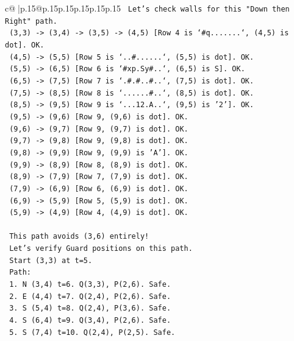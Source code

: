 \documentclass{article}
\begin{document}
{\begin{supertabular}{c@{$\;$}|p{.15\linewidth}@{}p{.15\linewidth}p{.15\linewidth}p{.15\linewidth}p{.15\linewidth}p{.15\linewidth}}
{{{\texttt{  Let's check walls for this "Down then Right" path.} \\
\texttt{  (3,3) {-}> (3,4) {-}> (3,5) {-}> (4,5) {[}Row 4 is `\#q.......`, (4,5) is dot{]}. OK.} \\
\texttt{  (4,5) {-}> (5,5) {[}Row 5 is `..\#......`, (5,5) is dot{]}. OK.} \\
\texttt{  (5,5) {-}> (6,5) {[}Row 6 is `\#xp.Sy\#..`, (6,5) is S{]}. OK.} \\
\texttt{  (6,5) {-}> (7,5) {[}Row 7 is `.\#.\#..\#..`, (7,5) is dot{]}. OK.} \\
\texttt{  (7,5) {-}> (8,5) {[}Row 8 is `......\#..`, (8,5) is dot{]}. OK.} \\
\texttt{  (8,5) {-}> (9,5) {[}Row 9 is `...12.A..`, (9,5) is '2'{]}. OK.} \\
\texttt{  (9,5) {-}> (9,6) {[}Row 9, (9,6) is dot{]}. OK.} \\
\texttt{  (9,6) {-}> (9,7) {[}Row 9, (9,7) is dot{]}. OK.} \\
\texttt{  (9,7) {-}> (9,8) {[}Row 9, (9,8) is dot{]}. OK.} \\
\texttt{  (9,8) {-}> (9,9) {[}Row 9, (9,9) is 'A'{]}. OK.} \\
\texttt{  (9,9) {-}> (8,9) {[}Row 8, (8,9) is dot{]}. OK.} \\
\texttt{  (8,9) {-}> (7,9) {[}Row 7, (7,9) is dot{]}. OK.} \\
\texttt{  (7,9) {-}> (6,9) {[}Row 6, (6,9) is dot{]}. OK.} \\
\texttt{  (6,9) {-}> (5,9) {[}Row 5, (5,9) is dot{]}. OK.} \\
\texttt{  (5,9) {-}> (4,9) {[}Row 4, (4,9) is dot{]}. OK.} \\
\\ 
\texttt{  This path avoids (3,6) entirely!} \\
\texttt{  Let's verify Guard positions on this path.} \\
\texttt{  Start (3,3) at t=5.} \\
\texttt{  Path:} \\
\texttt{  1. N (3,4) t=6. Q(3,3), P(2,6). Safe.} \\
\texttt{  2. E (4,4) t=7. Q(2,4), P(2,6). Safe.} \\
\texttt{  3. S (5,4) t=8. Q(2,4), P(3,6). Safe.} \\
\texttt{  4. S (6,4) t=9. Q(3,4), P(2,6). Safe.} \\
\texttt{  5. S (7,4) t=10. Q(2,4), P(2,5). Safe.} \\
\\ 
}}}
\end{supertabular}}
\end{document}
